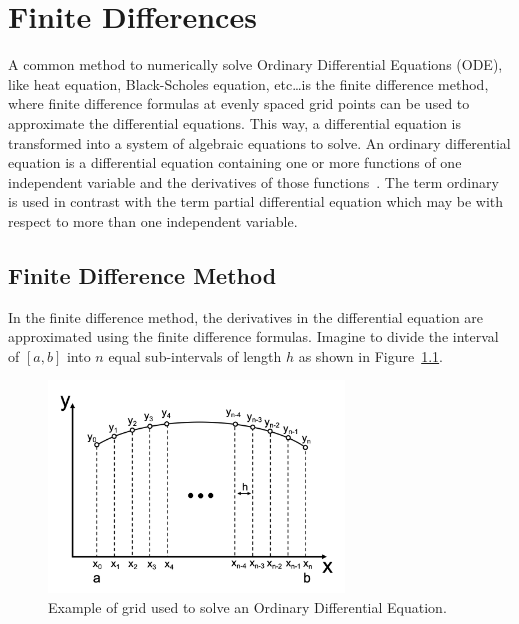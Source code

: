 \chapter{Finite Differences}
 
A common method to numerically solve Ordinary Differential Equations (ODE), like heat equation, Black-Scholes equation, etc\ldots is the finite difference method, where finite difference formulas at evenly spaced grid points can be used to approximate the differential equations. This way, a differential equation is transformed into a system of algebraic equations to solve.
An ordinary differential equation is a differential equation containing one or more functions of one independent variable and the derivatives of those functions~\cite{bib:ode}. The term ordinary is used in contrast with the term partial differential equation which may be with respect to more than one independent variable.

\section{Finite Difference Method}

In the finite difference method, the derivatives in the differential equation are approximated using the finite difference formulas. Imagine to divide the interval of $[a,b]$ into $n$ equal sub-intervals of length $h$ as shown in Figure~\ref{fig:finite_difference_1}.

\begin{figure}[htb]
	\centering
	\includegraphics[width=0.7\textwidth]{figures/finite_difference_1}
	\caption{Example of grid used to solve an Ordinary Differential Equation.}
	\label{fig:finite_difference_1}
\end{figure} 

